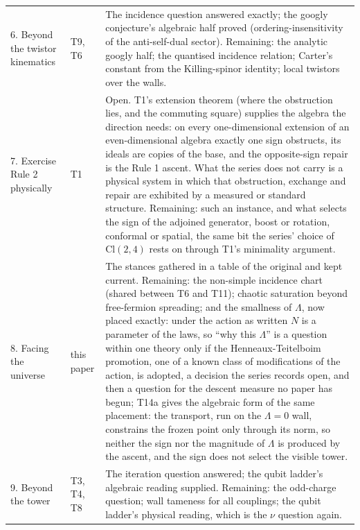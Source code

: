 \documentclass[11pt]{article}
\theoremstyle{definition}
\theoremstyle{plain}
\providecommand{\Cl}{}\renewcommand{\Cl}{\mathrm{Cl}}
\begin{document}
\begin{longtable}{p{} p{} p{}}
6. Beyond the twistor kinematics & T9, T6 & The incidence question answered exactly; the googly conjecture's algebraic half proved (ordering-insensitivity of the anti-self-dual sector). Remaining: the analytic googly half; the quantised incidence relation; Carter's constant from the Killing-spinor identity; local twistors over the walls. \\
7. Exercise Rule 2 physically & T1 & Open. T1's extension theorem (where the obstruction lies, and the commuting square) supplies the algebra the direction needs: on every one-dimensional extension of an even-dimensional algebra exactly one sign obstructs, its ideals are copies of the base, and the opposite-sign repair is the Rule 1 ascent. What the series does not carry is a physical system in which that obstruction, exchange and repair are exhibited by a measured or standard structure. Remaining: such an instance, and what selects the sign of the adjoined generator, boost or rotation, conformal or spatial, the same bit the series' choice of $\Cl(2,4)$ rests on through T1's minimality argument. \\
8. Facing the universe & this paper & The stances gathered in a table of the original and kept current. Remaining: the non-simple incidence chart (shared between T6 and T11); chaotic saturation beyond free-fermion spreading; and the smallness of $\Lambda$, now placed exactly: under the action as written $N$ is a parameter of the laws, so ``why this $\Lambda$'' is a question within one theory only if the Henneaux-Teitelboim promotion, one of a known class of modifications of the action, is adopted, a decision the series records open, and then a question for the descent measure no paper has begun; T14a \cite{ButlerT14a} gives the algebraic form of the same placement: the transport, run on the $\Lambda = 0$ wall, constrains the frozen point only through its norm, so neither the sign nor the magnitude of $\Lambda$ is produced by the ascent, and the sign does not select the visible tower. \\
9. Beyond the tower & T3, T4, T8 & The iteration question answered; the qubit ladder's algebraic reading supplied. Remaining: the odd-charge question; wall tameness for all couplings; the qubit ladder's physical reading, which is the $\nu$ question again. \\

\end{longtable}
\end{document}
